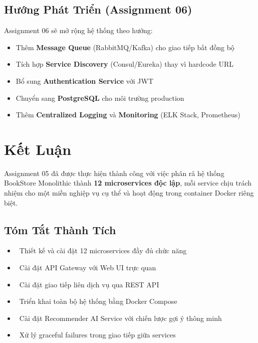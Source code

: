 \documentclass[12pt,a4paper]{article}
\begin{document}
\subsection{Hướng Phát Triển (Assignment 06)}

Assignment 06 sẽ mở rộng hệ thống theo hướng:
\begin{itemize}[leftmargin=1.5cm]
  \item Thêm \textbf{Message Queue} (RabbitMQ/Kafka) cho giao tiếp bất đồng bộ
  \item Tích hợp \textbf{Service Discovery} (Consul/Eureka) thay vì hardcode URL
  \item Bổ sung \textbf{Authentication Service} với JWT
  \item Chuyển sang \textbf{PostgreSQL} cho môi trường production
  \item Thêm \textbf{Centralized Logging} và \textbf{Monitoring} (ELK Stack, Prometheus)
\end{itemize}

\section{Kết Luận}

Assignment 05 đã được thực hiện thành công với việc phân rã hệ thống BookStore Monolithic thành \textbf{12 microservices độc lập}, mỗi service chịu trách nhiệm cho một miền nghiệp vụ cụ thể và hoạt động trong container Docker riêng biệt.

\subsection{Tóm Tắt Thành Tích}

\begin{itemize}[leftmargin=1.5cm]
  \item \checkmark\ Thiết kế và cài đặt 12 microservices đầy đủ chức năng
  \item \checkmark\ Cài đặt API Gateway với Web UI trực quan
  \item \checkmark\ Cài đặt giao tiếp liên dịch vụ qua REST API
  \item \checkmark\ Triển khai toàn bộ hệ thống bằng Docker Compose
  \item \checkmark\ Cài đặt Recommender AI Service với chiến lược gợi ý thông minh
  \item \checkmark\ Xử lý graceful failures trong giao tiếp giữa services
\end{itemize}
\end{document}
